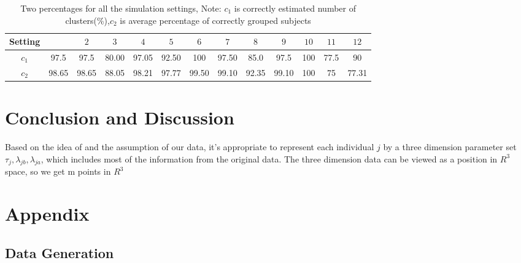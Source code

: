 \documentclass[12pt]{article}
\begin{document}
 \begin{table}[htp]
   \caption{\label{tab:set1}Two percentages for all the simulation settings, Note: $c_1$ is correctly estimated number of clusters(\%),$c_2$ is average percentage of correctly grouped subjects }
     \vspace{1ex}
  \centering
   \begin{tabular}{ccccccccccccc}
  \hline\hline
 \multicolumn{1}{p{1.2cm}}{Setting}
 &\multicolumn{1}{c}{ }
 &\multicolumn{1}{c}{$2$ } 
    &\multicolumn{1}{c}{$3$ }
       &\multicolumn{1}{c}{$4$ } 
    &\multicolumn{1}{c}{$5$ }
     &\multicolumn{1}{c}{$6$ }

       
    &\multicolumn{1}{c}{$7$ }
    &\multicolumn{1}{c}{$8$ }
    &\multicolumn{1}{c}{$9$ }
    &\multicolumn{1}{c}{$10$ }
    &\multicolumn{1}{c}{$11$ }
    &\multicolumn{1}{c}{$12$ }\\
    \hline
    $c_1$&97.5&97.5&80.00&97.05&92.50&100&97.50&85.0&97.5&100&77.5&90\\
    \hline
    $c_2$&98.65&98.65&88.05&98.21&97.77&99.50&99.10&92.35&99.10&100&75&77.31\\

    
\hline
     \end{tabular}%
 \end{table}%










\section{Conclusion and Discussion}\label{sec:discussion}
Based on the idea of \cite{perets2011clustering} and the assumption of our data, it's appropriate to represent each individual $j$ by a three dimension parameter set $\tau_j,\lambda_{jb},\lambda_{ja}$, which includes most of the information from the original data. The three dimension data can be viewed as a position in $R^3$ space, so we get m points in $R^3$
\section{Appendix}

\subsection{Data Generation}\label{sec:datageneration}



\end{document}
